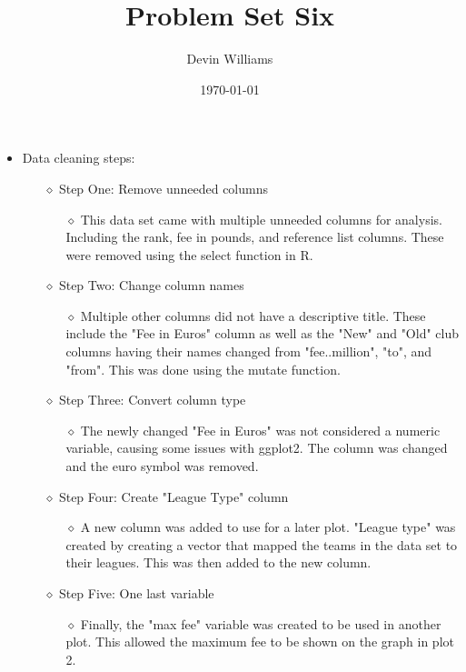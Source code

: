 \documentclass[12pt,letterpaper]{article}
\title{\textbf{Problem Set Six}}
\author{Devin Williams}
\date{\today}
\begin{document}
\maketitle

\begin{itemize}
    \item Data cleaning steps:
        \begin{itemize}
            \item[$\diamond$] Step One: Remove unneeded columns
                \begin{itemize}
                     \item[$\diamond$] This data set came with multiple unneeded columns for analysis. Including the rank, fee in pounds, and reference list columns. These were removed using the select function in R. 
                \end{itemize}
                \item[$\diamond$] Step Two: Change column names
                \begin{itemize}
                     \item[$\diamond$] Multiple other columns did not have a descriptive title. These include the "Fee in Euros" column as well as the "New" and "Old" club columns having their names changed from "fee..million", "to", and "from". This was done using the mutate function. 
                \end{itemize}
             \item[$\diamond$] Step Three: Convert column type
                \begin{itemize}
                     \item[$\diamond$] The newly changed "Fee in Euros" was not considered a numeric variable, causing some issues with ggplot2. The column was changed and the euro symbol was removed. 
                \end{itemize}
             \item[$\diamond$] Step Four: Create "League Type" column
                \begin{itemize}
                     \item[$\diamond$] A new column was added to use for a later plot. "League type" was created by creating a vector that mapped the teams in the data set to their leagues. This was then added to the new column. 
                \end{itemize}
             \item[$\diamond$] Step Five: One last variable
                \begin{itemize}
                     \item[$\diamond$] Finally, the "max fee" variable was created to be used in another plot. This allowed the maximum fee to be shown on the graph in plot 2. 
                \end{itemize}
         \end{itemize}
\end{itemize}
\end{document}

